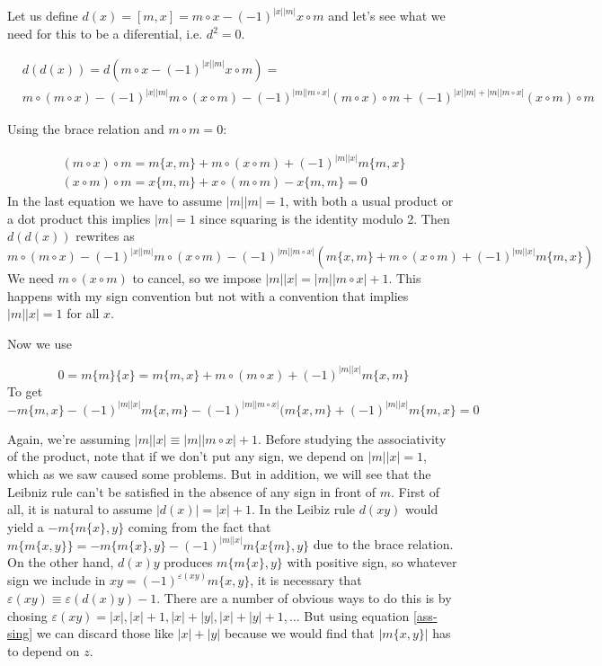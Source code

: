 \documentclass[twoside]{article}
\begin{document}
Let us define $d(x)=[m,x]=m\circ x-(-1)^{|x||m|}x\circ m$ and let's see what we need for this to be a diferential, i.e. $d^2=0$. 

\begin{align*}
&d(d(x))=d(m\circ x-(-1)^{|x||m|}x\circ m)=\\
&m\circ (m\circ x)-(-1)^{|x||m|}m\circ(x\circ m)-(-1)^{|m||m\circ x|}(m\circ x)\circ m +(-1)^{|x||m|+|m||m\circ x|}(x\circ m)\circ m
\end{align*}

Using the brace relation and $m\circ m=0$:

\begin{align*}
(m\circ x)\circ m= m\{x,m\}+m\circ(x \circ m)+(-1)^{|m||x|}m\{m,x\}\\
(x\circ m)\circ m=x\{m,m\}+x\circ (m\circ m)-x\{m,m\}=0
\end{align*}
In the last equation we have to assume $|m||m|= 1$, with both a usual product or a dot product this implies $|m|=1$ since squaring is the identity modulo 2. Then $d(d(x))$ rewrites as
 \[
 m\circ (m\circ x)-(-1)^{|x||m|}m\circ(x\circ m)-(-1)^{|m||m\circ x|}(m\{x,m\}+m\circ(x \circ m)+(-1)^{|m||x|}m\{m,x\})
 \]
 We need $m\circ(x\circ m)$ to cancel, so we impose $|m||x|= |m||m\circ x|+1$. This happens with my sign convention but not with a convention that implies $|m||x|=1$ for all $x$.
 
 Now we use
 
 $$0=m\{m\}\{x\}=m\{m,x\}+m\circ(m\circ x)+(-1)^{|m||x|}m\{x,m\}$$
 To get
 \[
-m\{m,x\}-(-1)^{|m||x|}m\{x,m\}-(-1)^{|m||m\circ x|}(m\{x,m\}+(-1)^{|m||x|}m\{m,x\}=0
 \]
 
 Again, we're assuming  $|m||x|\equiv |m||m\circ x|+1$. 
Before studying the associativity of the product, note that if we don't put any sign, we depend on $|m||x|=1$, which as we saw caused some problems. But in addition, we will see that the Leibniz rule can't be satisfied in the absence of any sign in front of $m$. First of all, it is natural to assume $|d(x)|=|x|+1$. In the Leibiz rule $d(xy)$ would yield a $-m\{m\{x\},y\}$ coming from the fact that $m\{m\{x,y\}\}=-m\{m\{x\},y\}-(-1)^{|m||x|}m\{x\{m\},y\}$ due to the brace relation. On the other hand, $d(x)y$ produces $m\{m\{x\},y\}$ with positive sign, so whatever sign we include in $xy=(-1)^{\varepsilon(xy)}m\{x,y\}$, it is necessary that $\varepsilon(xy)\equiv\varepsilon(d(x)y)-1$. There are a number of obvious ways to do this is by chosing $\varepsilon(xy)=|x|,|x|+1,|x|+|y|, |x|+|y|+1,\dots$ But using equation \ref{ass-sing} we can discard those like $|x|+|y|$ because we would find that $|m\{x,y\}|$ has to depend on $z$. 
\end{document}
